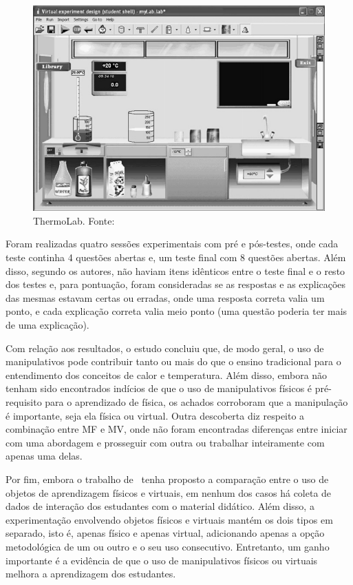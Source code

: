 \begin{figure}[htb]
	\centering
	\includegraphics[width=0.90\linewidth]{chapters/works/zacharia2011.png}
	\caption{ThermoLab. Fonte:~\cite{zacharia:2011}}
	\label{fig:zacharia_thermolab}
\end{figure}

Foram realizadas quatro sessões experimentais com pré e pós-testes, onde cada teste continha 4 questões abertas e, um teste final com 8 questões abertas. Além disso, segundo os autores, não haviam itens idênticos entre o teste final e o resto dos testes e, para pontuação, foram consideradas se as respostas e as explicações das mesmas estavam certas ou erradas, onde uma resposta correta valia um ponto, e cada explicação correta valia meio ponto (uma questão poderia ter mais de uma explicação).

Com relação aos resultados, o estudo concluiu que, de modo geral, o uso de manipulativos pode contribuir tanto ou mais do que o ensino tradicional para o entendimento dos conceitos de calor e temperatura. Além disso, embora não tenham sido encontrados indícios de que o uso de manipulativos físicos é pré-requisito para o aprendizado de física, os achados corroboram que a manipulação é importante, seja ela física ou virtual. Outra descoberta diz respeito a combinação entre MF e MV, onde não foram encontradas diferenças entre iniciar com uma abordagem e prosseguir com outra ou trabalhar inteiramente com apenas uma delas.

Por fim, embora o trabalho de~\cite{zacharia:2011} tenha proposto a comparação entre o uso de objetos de aprendizagem físicos e virtuais, em nenhum dos casos há coleta de dados de interação dos estudantes com o material didático. Além disso, a experimentação envolvendo objetos físicos e virtuais mantém os dois tipos em separado, isto é, apenas físico e apenas virtual, adicionando apenas a opção metodológica de um ou outro e o seu uso consecutivo. Entretanto, um ganho importante é a evidência de que o uso de manipulativos físicos ou virtuais melhora a aprendizagem dos estudantes.

